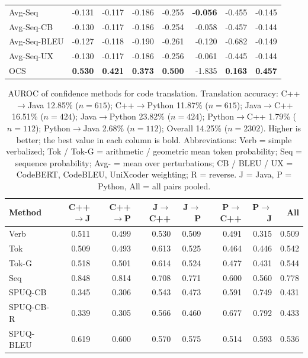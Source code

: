 {\begin{longtable}{@{}lrrrrrrr@{}}
\addlinespace
Avg-Seq & -0.131 & -0.117 & -0.186 & -0.255 & \textbf{-0.056} & -0.455 & -0.145 \\
Avg-Seq-CB & -0.130 & -0.117 & -0.186 & -0.254 & -0.058 & -0.457 & -0.144 \\
Avg-Seq-BLEU & -0.127 & -0.118 & -0.190 & -0.261 & -0.120 & -0.682 & -0.149 \\
Avg-Seq-UX & -0.130 & -0.117 & -0.186 & -0.256 & -0.061 & -0.445 & -0.144 \\
\addlinespace
OCS & \textbf{\phantom{-}0.530} & \textbf{\phantom{-}0.421} & \textbf{\phantom{-}0.373} & \textbf{\phantom{-}0.500} & -1.835 & \textbf{\phantom{-}0.163} & \textbf{\phantom{-}0.457} \\
\end{longtable}
}

{\scriptsize
\setlength{\tabcolsep}{2.5pt}
\renewcommand{\arraystretch}{0.95}
\begin{table}[t]
\centering
\caption{AUROC of confidence methods for code translation. Translation accuracy: C++$\rightarrow$Java 12.85\% ($n=615$); C++$\rightarrow$Python 11.87\% ($n=615$); Java$\rightarrow$C++ 16.51\% ($n=424$); Java$\rightarrow$Python 23.82\% ($n=424$); Python$\rightarrow$C++ 1.79\% ($n=112$); Python$\rightarrow$Java 2.68\% ($n=112$); Overall 14.25\% ($n=2302$). Higher is better; the best value in each column is bold. Abbreviations: Verb = simple verbalized; Tok / Tok-G = arithmetic / geometric mean token probability; Seq = sequence probability; Avg- = mean over perturbations; CB / BLEU / UX = CodeBERT, CodeBLEU, UniXcoder weighting; R = reverse. J = Java, P = Python, All = all pairs pooled.}
\label{tab:translation-auroc}
\begin{tabular}{@{}lrrrrrrr@{}}
\toprule
Method & C++$\to$J & C++$\to$P & J$\to$C++ & J$\to$P & P$\to$C++ & P$\to$J & All \\
\midrule
Verb & 0.511 & 0.499 & 0.530 & 0.509 & 0.491 & 0.315 & 0.509 \\
\addlinespace
Tok & 0.509 & 0.493 & 0.613 & 0.525 & 0.464 & 0.446 & 0.542 \\
Tok-G & 0.518 & 0.501 & 0.614 & 0.524 & 0.477 & 0.431 & 0.544 \\
\addlinespace
Seq & 0.848 & 0.814 & 0.708 & 0.771 & 0.600 & 0.560 & 0.778 \\
\addlinespace
SPUQ-CB & 0.345 & 0.306 & 0.543 & 0.473 & 0.591 & 0.749 & 0.431 \\
SPUQ-CB-R & 0.339 & 0.305 & 0.566 & 0.460 & 0.677 & 0.792 & 0.433 \\
SPUQ-BLEU & 0.619 & 0.600 & 0.570 & 0.575 & 0.514 & 0.593 & 0.536 \\

\end{tabular}
\end{table}}

